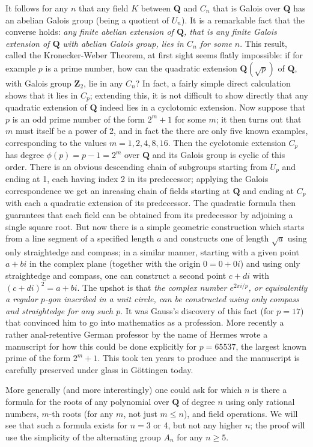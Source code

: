\documentclass[10pt]{article}
\begin{document}
It follows for any $n$ that any field $K$ between $\mathbf Q$ and $C_n$
that is Galois over $\mathbf Q$ has an abelian Galois group (being a
quotient of $U_n$). It is a remarkable fact that the converse holds:
{\sl any finite abelian extension of $\mathbf Q$, that is any finite
  Galois extension of $\mathbf Q$ with abelian Galois group, lies in
  $C_n$ for some $n$}. This result, called the Kronecker-Weber Theorem,
at first sight seems flatly impossible: if for example $p$ is a prime
number, how can the quadratic extension $\mathbf Q(\sqrt{p})$ of
$\mathbf Q$, with Galois group $\mathbf Z_2$, lie in any $C_n$? In fact,
a fairly simple direct calculation shows that it lies in $C_p$;
extending this, it is not difficult to show directly that any quadratic
extension of $\mathbf Q$ indeed lies in a cyclotomic extension. Now
suppose that $p$ is an odd prime number of the form $2^m + 1$ for some
$m$; it then turns out that $m$ must itself be a power of 2, and in fact
the there are only five known examples, corresponding to the values
$m=1,2,4,8,16$. Then the cyclotomic extension $C_p$ has degree $\phi(p)
= p-1 = 2^m$ over $\mathbf Q$ and its Galois group is cyclic of this
order. There is an obvious descending chain of subgroups starting from
$U_p$ and ending at 1, each having index 2 in its predecessor; applying
the Galois correspondence we get an inreasing chain of fields starting
at $\mathbf Q$ and ending at $C_p$ with each a quadratic extension of
its predecessor. The quadratic formula then guarantees that each field
can be obtained from its predecessor by adjoining a single square root.
But now there is a simple geometric construction which starts from a
line segment of a specified length $a$ and constructs one of length
$\sqrt{a}$ using only straightedge and compass; in a similar manner,
starting with a given point $a+bi$ in the complex plane (together with
the origin $0 = 0 + 0i$) and using only straightedge and compass, one
can construct a second point $c+di$ with $(c+di)^2 = a+bi$. The upshot
is that {\sl the complex number $e^{2\pi i/p}$, or equivalently a
  regular $p$-gon inscribed in a unit circle, can be constructed using
  only compass and straightedge for any such $p$}. It was Gauss's
discovery of this fact (for $p=17$) that convinced him to go into
mathematics as a profession. More recently a rather anal-retentive
German professor by the name of Hermes wrote a manuscript for how this
could be done explicitly for $p = 65537$, the largest known prime of the
form $2^m + 1$. This took ten years to produce and the manuscript is
carefully preserved under glass in G\"ottingen today.

More generally (and more interestingly) one could ask for which $n$ is
there a formula for the roots of any polynomial over $\mathbf Q$ of
degree $n$ using only rational numbers, $m$-th roots (for any $m$, not
just $m\le n$), and field operations. We will see that such a formula
exists for $n=3$ or 4, but not any higher $n$; the proof will use the
simplicity of the alternating group $A_n$ for any $n\ge5$.
\end{document}
